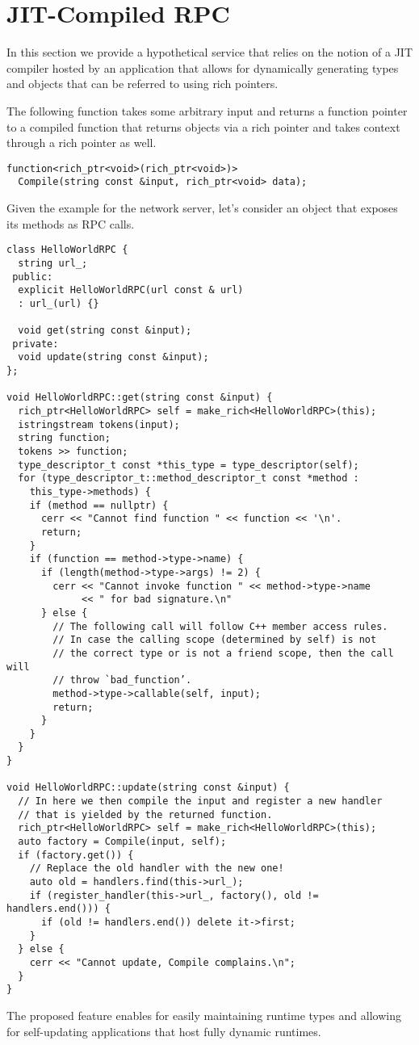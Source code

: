 \section{JIT-Compiled RPC}
\label{appendix:jit-rpc-example}
In this section we provide a hypothetical service that relies on the
notion of a JIT compiler hosted by an application that allows for dynamically
generating types and objects that can be referred to using rich pointers.

The following function takes some arbitrary input and returns a function pointer
to a compiled function that returns objects via a rich pointer and takes context
through a rich pointer as well.

\begin{verbatim}
function<rich_ptr<void>(rich_ptr<void>)>
  Compile(string const &input, rich_ptr<void> data);
\end{verbatim}

Given the example for the network server, let’s consider an object
that exposes its methods as RPC calls.
\begin{verbatim}
class HelloWorldRPC {
  string url_;
 public:
  explicit HelloWorldRPC(url const & url)
  : url_(url) {}

  void get(string const &input);
 private:
  void update(string const &input);
};

void HelloWorldRPC::get(string const &input) {
  rich_ptr<HelloWorldRPC> self = make_rich<HelloWorldRPC>(this);
  istringstream tokens(input);
  string function;
  tokens >> function;
  type_descriptor_t const *this_type = type_descriptor(self);
  for (type_descriptor_t::method_descriptor_t const *method :
    this_type->methods) {
    if (method == nullptr) {
      cerr << "Cannot find function " << function << '\n'.
      return;
    }
    if (function == method->type->name) {
      if (length(method->type->args) != 2) {
        cerr << "Cannot invoke function " << method->type->name
             << " for bad signature.\n"
      } else {
        // The following call will follow C++ member access rules.
        // In case the calling scope (determined by self) is not
        // the correct type or is not a friend scope, then the call will
        // throw `bad_function’.
        method->type->callable(self, input);
        return;
      }
    }
  }
}

void HelloWorldRPC::update(string const &input) {
  // In here we then compile the input and register a new handler
  // that is yielded by the returned function.
  rich_ptr<HelloWorldRPC> self = make_rich<HelloWorldRPC>(this);
  auto factory = Compile(input, self);
  if (factory.get()) {
    // Replace the old handler with the new one!
    auto old = handlers.find(this->url_);
    if (register_handler(this->url_, factory(), old != handlers.end())) {
      if (old != handlers.end()) delete it->first;
    }
  } else {
    cerr << "Cannot update, Compile complains.\n";
  }
}
\end{verbatim}

The proposed feature enables for easily maintaining runtime types and allowing
for self-updating applications that host fully dynamic runtimes.
